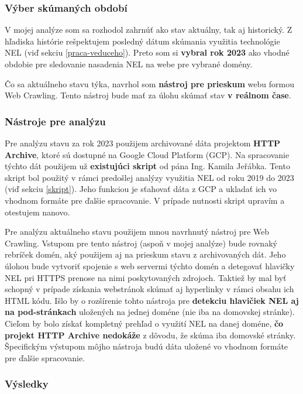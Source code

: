 \pagebreak

\subsubsection{Výber skúmaných období}

V mojej analýze som sa rozhodol zahrnúť ako stav aktuálny, tak aj historický.
Z hľadiska histórie rešpektujem posledný dátum skúmania využitia technológie NEL (viď sekciu \ref{praca-veduceho}).
Preto som si \textbf{vybral rok 2023} ako vhodné obdobie pre sledovanie nasadenia NEL na webe pre vybrané domény.

Čo sa aktuálneho stavu týka, navrhol som \textbf{nástroj pre prieskum} webu formou Web Crawling.
Tento nástroj bude mať za úlohu skúmať stav \textbf{v reálnom čase}.

\subsubsection{Nástroje pre analýzu}

Pre analýzu stavu za rok 2023 použijem archivované dáta projektom \textbf{HTTP Archive}, ktoré sú dostupné na Google Cloud Platform (GCP).
Na spracovanie týchto dát použijem už \textbf{existujúci skript} od pána Ing. Kamila Jeřábka. 
Tento skript bol použitý v rámci predošlej analýzy využitia NEL od roku 2019 do 2023 (viď sekciu \ref{skript}).
Jeho funkciou je sťahovať dáta z GCP a ukladať ich vo vhodnom formáte pre ďalšie spracovanie.
V prípade nutnosti skript upravím a otestujem nanovo.

Pre analýzu aktuálneho stavu použijem mnou navrhnutý nástroj pre Web Crawling. 
Vstupom pre tento nástroj (aspoň v mojej analýze) bude rovnaký rebríček domén, 
aký použijem aj na prieskum stavu z archivovaných dát.
Jeho úlohou bude vytvoriť spojenie s web servermi týchto domén a detegovať hlavičky NEL pri HTTPS prenose na nimi poskytovaných zdrojoch.
Taktiež by mal byť schopný v prípade získania webstránok skúmať aj hyperlinky v rámci obsahu ich HTML kódu.
Išlo by o rozšírenie tohto nástroja pre \textbf{detekciu hlavičiek NEL aj na pod-stránkach} uložených na jednej doméne (nie iba na domovskej stránke).
Cieľom by bolo získať kompletný prehľad o využití NEL na danej doméne, \textbf{čo projekt HTTP Archive nedokáže} z dôvodu, že skúma iba domovské stránky. 
Špecifickým výstupom môjho nástroja budú dáta uložené vo vhodnom formáte pre ďalšie spracovanie.


\subsubsection{Výsledky}

